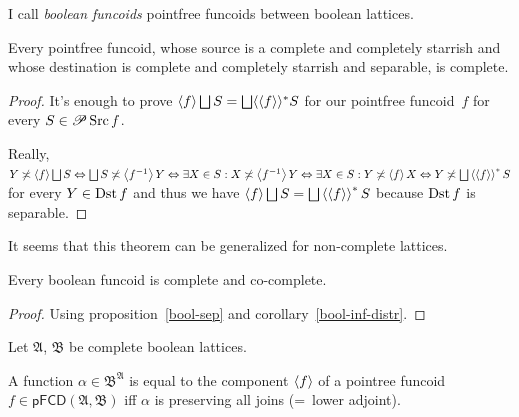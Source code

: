 I call \emph{boolean funcoids} pointfree funcoids between boolean lattices.

\begin{prop}
  Every pointfree funcoid, whose source is a complete and completely starrish and whose destination is complete and completely starrish and separable,
  is complete.
\end{prop}

\begin{proof}
  It's enough to prove $\supfun{f} \bigsqcup S = \bigsqcup \langle
  \supfun{f} \rangle^{\ast} S$ for our pointfree funcoid~$f$ for every $S
  \in \mathscr{P} \operatorname{Src} f$.
  
  Really, $Y \nasymp \supfun{f} \bigsqcup S \Leftrightarrow \bigsqcup S
  \nasymp \supfun{f^{- 1}} Y \Leftrightarrow \exists X \in S : X
  \nasymp \supfun{f^{- 1}} Y \Leftrightarrow \exists X \in S : Y
  \nasymp \supfun{f} X \Leftrightarrow Y \nasymp \bigsqcup \rsupfun{\supfun{f}} S$ for every $Y \in \operatorname{Dst} f$ and thus
  we have $\supfun{f} \bigsqcup S = \bigsqcup
  \rsupfun{\supfun{f}} S$ because $\operatorname{Dst} f$ is separable.
\end{proof}

\begin{rem}
It seems that this theorem can be generalized for non-complete lattices.
\end{rem}

\begin{cor}
  Every boolean funcoid is complete and co-complete.
\end{cor}

\begin{proof}
Using proposition~\ref{bool-sep} and corollary~\ref{bool-inf-distr}.
\end{proof}

\begin{thm}\label{bfunc-is-adj}
  Let $\mathfrak{A}$, $\mathfrak{B}$ be complete boolean lattices.

  A function $\alpha \in \mathfrak{B}^{\mathfrak{A}}$ is equal to the
  component $\left\langle f\right\rangle$ of a pointree funcoid $f \in \mathsf{pFCD}
  (\mathfrak{A}, \mathfrak{B})$ iff $\alpha$ is preserving all joins (=~lower
  adjoint).
\end{thm}

